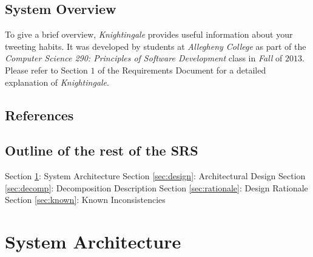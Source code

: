 \documentclass[a4paper, 12pt]{article}
\begin{document}
\subsection{System Overview} \label{sec:view}
\begin{adjustwidth}{2em}{0pt}
To give a brief overview, \textit{Knightingale} provides useful information about your tweeting habits. It was developed by students at \textit{Allegheny College} as part of the \textit{Computer Science 290: Principles of Software Development} class in \textit{Fall} of $2013$. Please refer to Section $1$ of the Requirements Document for a detailed explanation of \textit{Knightingale}. \newline
\end{adjustwidth}

\subsection{References} \label{sec:ref}
\begin{adjustwidth}{2em}{0pt}

\end{adjustwidth}

\subsection{Outline of the rest of the SRS} \label{sec:outline}
\begin{adjustwidth}{2em}{0pt}
Section \ref{sec:arch}: System Architecture \newline
Section \ref{sec:design}: Architectural Design \newline
Section \ref{sec:decomp}: Decomposition Description \newline
Section \ref{sec:rationale}: Design Rationale \newline
Section \ref{sec:known}: Known Inconsistencies \newline
\end{adjustwidth}

\section{System Architecture} \label{sec:arch}
\end{document}
